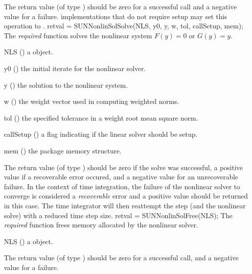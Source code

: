 {
  The return value  (of type ) should be zero for a
  successful call and a negative value for a failure.
}
{
  {\sunnonlinsol} implementations that do not require setup may set
  this operation to .
}
{
  retval = SUNNonlinSolSolve(NLS, y0, y, w, tol, callSetup, mem);
}
{
  The \textit{required} function  solves the
  nonlinear system $F(y)=0$ or $G(y)=y$.
}
{
  \begin{args}[callSetup]
  \item[NLS] ()
    a {\sunnonlinsol} object.
  \item[y0] ()
    the initial iterate for the nonlinear solver.
  \item[y] ()
    the solution to the nonlinear system.
  \item[w] ()
    the weight vector used in computing weighted norms.
  \item[tol] ()
    the specified tolerance in a weight root mean square norm.
  \item[callSetup] ()
    a flag indicating if the linear solver should be setup.
  \item[mem] ()
    the {\sundials} package memory structure.
  \end{args}
}
{
  The return value  (of type ) should be zero if
  the solve was successful, a positive value if a recoverable error
  occured, and a negative value for an unrecoverable failure.
}
{
  In the context of time integration, the failure of the nonlinear
  solver to converge is considered a \textit{recoverable} error and a
  positive value should be returned in this case. The time integrator
  will then reattempt the step (and the nonlinear solve) with a
  reduced time step size.
}
{
  retval = SUNNonlinSolFree(NLS);
}
{
  The \textit{required} function  frees memory
  allocated by the nonlinear solver.
}
{
  \begin{args}[NLS]
  \item[NLS] ()
    a {\sunnonlinsol} object.
  \end{args}
}
{
  The return value  (of type ) should be zero for a
  successful call, and a negative value for a failure.
}
{}


